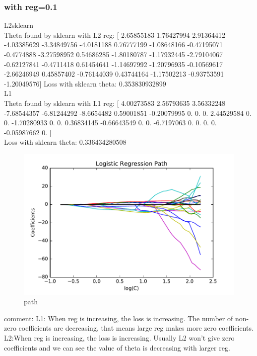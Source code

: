 \documentclass[pdftex,11pt]{article}
\begin{document}
\subsubsection{with reg=0.1}
L2sklearn\\
Theta found by sklearn with L2 reg:  [ 2.65855183  1.76427994  2.91364412 -4.03385629 -3.34849756 -4.0181188
  0.76777199 -1.08648166 -0.47195071 -0.4774888  -3.27598952  0.54686285
 -1.80180787 -1.17932445 -2.79104067 -0.62127841 -0.4711418   0.61454641
 -1.14697992 -1.20796935 -0.10569617 -2.66246949  0.45857402 -0.76144039
  0.43744164 -1.17502213 -0.93753591 -1.20049576]
Loss with sklearn theta:  0.353830932899\\
L1\\
Theta found by sklearn with L1 reg:  [ 4.00273583  2.56793635  3.56332248 -7.68544357 -6.81244292 -8.6654482
  0.59001851 -0.20079995  0.          0.          0.          2.44529584
  0.          0.         -1.70280933  0.          0.          0.36834145
 -0.66643549  0.          0.         -6.7197063   0.          0.          0.
  0.         -0.05987662  0.        ]\\
Loss with sklearn theta:  0.336434280508\\
\begin{figure}[H]
  \caption{path}
  \centering
    \includegraphics[scale=0.5]{fig5reg01.pdf}
\end{figure}


comment:
L1: When reg is increasing, the loss is increasing. The number of non-zero coefficients are decreasing, that means large reg makes more zero coefficients.
L2:When reg is increasing, the loss is increasing. Usually L2 won't give zero coefficients and we can see the value of theta is decreasing with larger reg.
\end{document}
